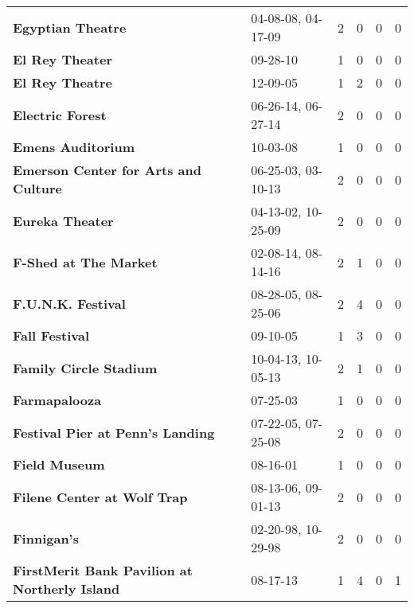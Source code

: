 \begin{supertabular}{p{0.4\textwidth}p{0.3\textwidth}p{0.05\textwidth}p{0.05\textwidth}p{0.05\textwidth}p{0.05\textwidth}}
                                            \textbf{Egyptian Theatre} &  04-08-08, 04-17-09 &  2 &  0 &  0 &  0 \\
                                              \textbf{El Rey Theater} &            09-28-10 &  1 &  0 &  0 &  0 \\
                                              \textbf{El Rey Theatre} &            12-09-05 &  1 &  2 &  0 &  0 \\
                                             \textbf{Electric Forest} &  06-26-14, 06-27-14 &  2 &  0 &  0 &  0 \\
                                            \textbf{Emens Auditorium} &            10-03-08 &  1 &  0 &  0 &  0 \\
                         \textbf{Emerson Center for Arts and Culture} &  06-25-03, 03-10-13 &  2 &  0 &  0 &  0 \\
                                              \textbf{Eureka Theater} &  04-13-02, 10-25-09 &  2 &  0 &  0 &  0 \\
                                        \textbf{F-Shed at The Market} &  02-08-14, 08-14-16 &  2 &  1 &  0 &  0 \\
                                           \textbf{F.U.N.K. Festival} &  08-28-05, 08-25-06 &  2 &  4 &  0 &  0 \\
                                               \textbf{Fall Festival} &            09-10-05 &  1 &  3 &  0 &  0 \\
                                       \textbf{Family Circle Stadium} &  10-04-13, 10-05-13 &  2 &  1 &  0 &  0 \\
                                                \textbf{Farmapalooza} &            07-25-03 &  1 &  0 &  0 &  0 \\
                             \textbf{Festival Pier at Penn's Landing} &  07-22-05, 07-25-08 &  2 &  0 &  0 &  0 \\
                                                \textbf{Field Museum} &            08-16-01 &  1 &  0 &  0 &  0 \\
                                  \textbf{Filene Center at Wolf Trap} &  08-13-06, 09-01-13 &  2 &  0 &  0 &  0 \\
                                                  \textbf{Finnigan's} &  02-20-98, 10-29-98 &  2 &  0 &  0 &  0 \\
                \textbf{FirstMerit Bank Pavilion at Northerly Island} &            08-17-13 &  1 &  4 &  0 &  1 \\

\end{supertabular}
